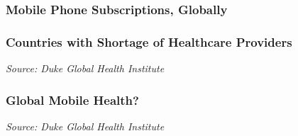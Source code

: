 \documentclass[10pt,xcolor=dvipsnames]{beamer}
\begin{document}
\begin{frame}
\frametitle{Mobile Phone Subscriptions, Globally}
\begin{figure}
\end{figure}
\end{frame}


\begin{frame}
\frametitle{Countries with Shortage of Healthcare Providers}
\begin{figure}
\end{figure}
{\em Source: Duke Global Health Institute}
\end{frame}



\begin{frame}
\frametitle{Global Mobile Health?}
\begin{figure}
\end{figure}
{\em Source: Duke Global Health Institute}
\end{frame}
\end{document}
